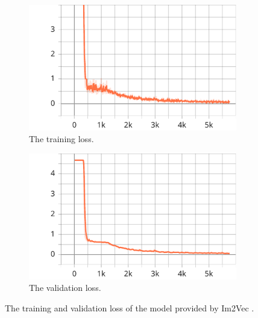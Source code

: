 \begin{figure}
    \centering
    \begin{subfigure}{.45\textwidth}
        \includegraphics[width=\textwidth]{graphics/work-artifacts/im2vec/110/loss.pdf}
        \caption{The training loss.}
    \end{subfigure}
    \begin{subfigure}{.45\textwidth}
        \includegraphics[width=\textwidth]{graphics/work-artifacts/im2vec/110/avg_val_loss.pdf}
        \caption{The validation loss.}
    \end{subfigure}
    \caption{The training and validation loss of the model provided by Im2Vec \citep{DBLP:conf/cvpr/Reddy21}.}
    \label{fig:110.loss}
\end{figure}

